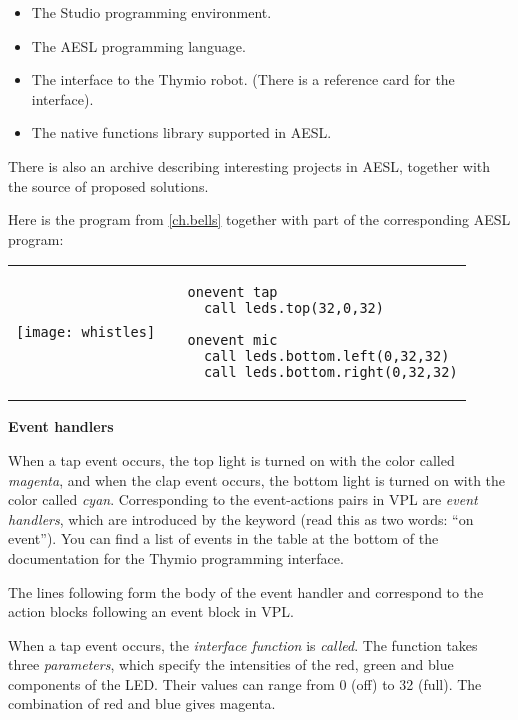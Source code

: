 \begin{itemize}
\item The Studio programming environment.
\item The AESL programming language.
\item The interface to the Thymio robot.
(There is a reference card for the interface).
\item The native functions library supported in AESL.
\end{itemize}

There is also an archive describing interesting projects in AESL,
together with the source of proposed solutions.


Here is the program  from \cref{ch.bells} together with
part of the corresponding AESL program:
 
\begin{center}
\begin{tabular}{ll}
\texttt{[image: whistles]} &
\begin{minipage}[b]{.5\textwidth}
\begin{footnotesize}
\begin{verbatim}
  onevent tap
    call leds.top(32,0,32)
  
  onevent mic
    call leds.bottom.left(0,32,32)
    call leds.bottom.right(0,32,32)
\end{verbatim}
\end{footnotesize}
\vspace*{8ex}
\end{minipage}
\end{tabular}
\end{center}

\textbf{\large Event handlers}

When a tap event occurs, the top light is turned on with the color
called \emph{magenta}, and when the clap event occurs, the bottom light
is turned on with the color called \emph{cyan}. Corresponding to the
event-actions pairs in VPL are \emph{event handlers}, which are
introduced by the keyword  (read this as two words: ``on
event''). You can find a list of events in the table at the bottom of
the documentation for the Thymio programming interface.

The lines following  form the body of the event handler
and correspond to the action blocks following an event block in VPL.

When a tap event occurs, the \emph{interface function}  is
\emph{called}. The function takes three \emph{parameters}, which specify
the intensities of the red, green and blue components of the LED.
Their values can range from 0 (off) to 32 (full). The combination of red
and blue gives magenta.

